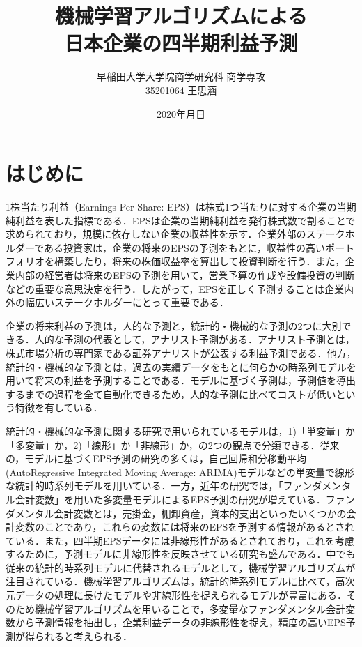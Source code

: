 \documentclass[a4paper，12pt]{jsarticle}
\title{機械学習アルゴリズムによる\\
  日本企業の四半期利益予測}
\author{早稲田大学大学院商学研究科 商学専攻\\
  35201064 王思涵}
\date{2020年月日}
\begin{document}
\maketitle
\tableofcontents

\part{はじめに}

1株当たり利益（Earnings Per Share: EPS）は株式1つ当たりに対する企業の当期純利益を表した指標である．EPSは企業の当期純利益を発行株式数で割ることで求められており，規模に依存しない企業の収益性を示す．企業外部のステークホルダーである投資家は，企業の将来のEPSの予測をもとに，収益性の高いポートフォリオを構築したり，将来の株価収益率を算出して投資判断を行う．また，企業内部の経営者は将来のEPSの予測を用いて，営業予算の作成や設備投資の判断などの重要な意思決定を行う．したがって，EPSを正しく予測することは企業内外の幅広いステークホルダーにとって重要である．

企業の将来利益の予測は，人的な予測と，統計的・機械的な予測の2つに大別できる\citep{sakurai1990}．人的な予測の代表として，アナリスト予測がある．アナリスト予測とは，株式市場分析の専門家である証券アナリストが公表する利益予測である．他方，統計的・機械的な予測とは，過去の実績データをもとに何らかの時系列モデルを用いて将来の利益を予測することである．モデルに基づく予測は，予測値を導出するまでの過程を全て自動化できるため，人的な予測に比べてコストが低いという特徴を有している\citep{sakurai1990}．

統計的・機械的な予測に関する研究で用いられているモデルは，1)「単変量」か「多変量」か，2)「線形」か「非線形」か，の2つの観点で分類できる\citep{zhang2004neural}．従来の，モデルに基づくEPS予測の研究の多くは，自己回帰和分移動平均(AutoRegressive Integrated Moving Average: ARIMA)モデル\citep*{box2015time}などの単変量で線形な統計的時系列モデルを用いている\citep*{foster1977quarterly, griffin1977time, brown1979univariate}．一方，近年の研究では，「ファンダメンタル会計変数」を用いた多変量モデルによるEPS予測の研究が増えている．ファンダメンタル会計変数とは，売掛金，棚卸資産，資本的支出といったいくつかの会計変数のことであり，これらの変数には将来のEPSを予測する情報があるとされている\citep*{lev1993fundamental, abarbanell1997fundamental}．また，四半期EPSデータには非線形性があるとされており\citep*{hopwood1986univariate}，これを考慮するために，予測モデルに非線形性を反映させている研究も盛んである．中でも従来の統計的時系列モデルに代替されるモデルとして，機械学習アルゴリズムが注目されている．機械学習アルゴリズムは，統計的時系列モデルに比べて，高次元データの処理に長けたモデルや非線形性を捉えられるモデルが豊富にある\citep*{cao2020fundamental}．そのため機械学習アルゴリズムを用いることで，多変量なファンダメンタル会計変数から予測情報を抽出し，企業利益データの非線形性を捉え，精度の高いEPS予測が得られると考えられる．
\end{document}
